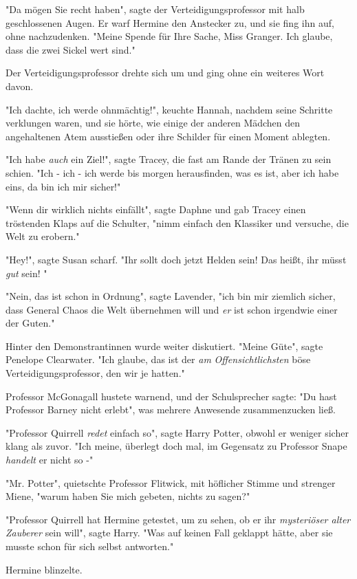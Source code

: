 {"Da mögen Sie recht haben", sagte der Verteidigungsprofessor mit halb geschlossenen Augen. Er warf Hermine den Anstecker zu, und sie fing ihn auf, ohne nachzudenken. "Meine Spende für Ihre Sache, Miss Granger. Ich glaube, dass die zwei Sickel wert sind."

Der Verteidigungsprofessor drehte sich um und ging ohne ein weiteres Wort davon.

"Ich dachte, ich werde ohnmächtig!", keuchte Hannah, nachdem seine Schritte verklungen waren, und sie hörte, wie einige der anderen Mädchen den angehaltenen Atem ausstießen oder ihre Schilder für einen Moment ablegten.

"Ich habe \emph{auch} ein Ziel!", sagte Tracey, die fast am Rande der Tränen zu sein schien. "Ich - ich - ich werde bis morgen herausfinden, was es ist, aber ich habe eins, da bin ich mir sicher!"

"Wenn dir wirklich nichts einfällt", sagte Daphne und gab Tracey einen tröstenden Klaps auf die Schulter, "nimm einfach den Klassiker und versuche, die Welt zu erobern."

"Hey!", sagte Susan scharf. "Ihr sollt doch jetzt Helden sein! Das heißt, ihr müsst \emph{gut} sein! "

"Nein, das ist schon in Ordnung", sagte Lavender, "ich bin mir ziemlich sicher, dass General Chaos die Welt übernehmen will und \emph{er} ist schon irgendwie einer der Guten."

Hinter den Demonstrantinnen wurde weiter diskutiert. "Meine Güte", sagte Penelope Clearwater. "Ich glaube, das ist der \emph{am} \emph{Offensichtlichsten} böse Verteidigungsprofessor, den wir je hatten."

Professor McGonagall hustete warnend, und der Schulsprecher sagte: "Du hast Professor Barney nicht erlebt", was mehrere Anwesende zusammenzucken ließ.

"Professor Quirrell \emph{redet} einfach so", sagte Harry Potter, obwohl er weniger sicher klang als zuvor. "Ich meine, überlegt doch mal, im Gegensatz zu Professor Snape \emph{handelt} er nicht so -"

"Mr. Potter", quietschte Professor Flitwick, mit höflicher Stimme und strenger Miene, "warum haben Sie mich gebeten, nichts zu sagen?"

"Professor Quirrell hat Hermine getestet, um zu sehen, ob er ihr \emph{mysteriöser alter Zauberer} sein will", sagte Harry. "Was auf keinen Fall geklappt hätte, aber sie musste schon für sich selbst antworten."

Hermine blinzelte.

}
